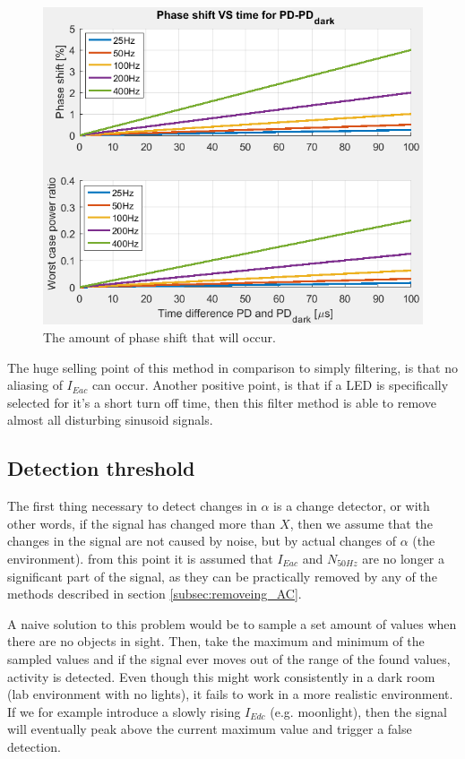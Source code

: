 \begin{figure}
	\includegraphics[width=\textwidth]{pics/PasheshiftVStime.png}
	\caption{The amount of phase shift that will occur.}
	\label{fig:Phaseshift}
\end{figure}

The huge selling point of this method in comparison to simply filtering, is that no aliasing of $I_{Eac}$ can occur. Another positive point, is that if a LED is specifically selected for it's a short turn off time, then this filter method is able to remove almost all disturbing sinusoid signals. 

\subsection{Detection threshold}
The first thing necessary to detect changes in $\alpha$ is a change detector, or with other words, if the signal has changed more than $X$, then we assume that the changes in the signal are not caused by noise, but by actual changes of $\alpha$ (the environment). from this point it is assumed that $I_{Eac}$ and $N_{50Hz}$ are no longer a significant part of the signal, as they can be practically removed by any of the methods described in section \ref{subsec:removeing_AC}.

A naive solution to this problem would be to sample a set amount of values when there are no objects in sight. Then, take the maximum and minimum of the sampled values and if the signal ever moves out of the range of the found values, activity is detected. Even though this might work consistently in a dark room (lab environment with no lights), it fails to work in a more realistic environment. If we for example introduce a slowly rising $I_{Edc}$ (e.g. moonlight), then the signal will eventually peak above the current maximum value and trigger a false detection.

